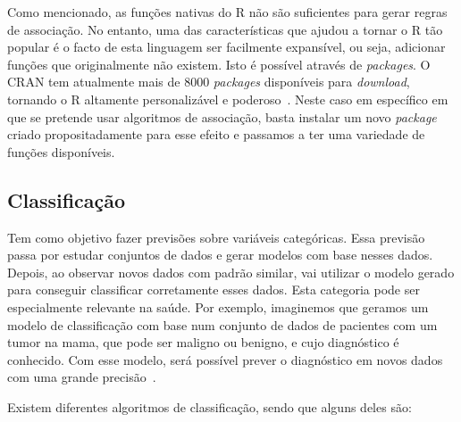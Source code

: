 Como mencionado, as funções nativas do R não são suficientes para gerar regras de associação. No entanto, uma das características que ajudou a tornar o R tão popular é o facto de esta linguagem ser facilmente expansível, ou seja, adicionar funções que originalmente não existem. Isto é possível através de \textit{packages}.
O \ac{CRAN} tem atualmente mais de 8000 \textit{packages} disponíveis para \textit{download}, tornando o R altamente personalizável e poderoso~\cite{cran}.
Neste caso em específico em que se pretende usar algoritmos de associação, basta instalar um novo \textit{package} criado propositadamente para esse efeito e passamos a ter uma variedade de funções disponíveis. 

\subsection{Classificação}

Tem como objetivo fazer previsões sobre variáveis categóricas. Essa previsão passa por estudar conjuntos de dados e gerar modelos com base nesses dados. Depois, ao observar novos dados com padrão similar, vai utilizar o modelo gerado para conseguir classificar corretamente esses dados. Esta categoria pode ser especialmente relevante na saúde. Por exemplo, imaginemos que geramos um modelo de classificação com base num conjunto de dados de pacientes com um tumor na mama, que pode ser maligno ou benigno, e cujo diagnóstico é conhecido. Com esse modelo, será possível prever o diagnóstico em novos dados com uma grande precisão~\cite{cancerpred}.

Existem diferentes algoritmos de classificação, sendo que alguns deles são:


